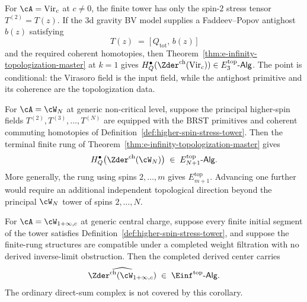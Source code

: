 \begin{corollary}[Virasoro ($N=2$) recovers the Volume~II
climax]
\label{cor:virasoro-N-2-climax}
\ClaimStatusConditional
{}%
For $\cA = \mathrm{Vir}_c$ at $c \ne 0$, the finite tower has
only the spin-$2$ stress tensor $T^{(2)}=T(z)$. If the
$3$d gravity BV model supplies a Faddeev--Popov antighost
$b(z)$ satisfying
\[
 T(z) \;=\; \bigl[\,Q_{\mathrm{tot}},\, b(z)\,\bigr]
\]
and the required coherent homotopies, then
Theorem~\textup{\ref{thm:e-infinity-topologization-master}}
at $k=1$ gives
$H^\bullet_Q(\Zder^{\mathrm{ch}}(\mathrm{Vir}_c))
\in E_3^{\mathrm{top}}\text{-}\mathsf{Alg}$. The point is
conditional: the Virasoro field is the input field, while the
antighost primitive and its coherence are the topologization
data.
\end{corollary}

\begin{corollary}
\label{cor:WN-E-Nplus1-top}
\ClaimStatusConditional
{}%
For $\cA = \cW_N$ at generic non-critical level, suppose the
principal higher-spin fields
$T^{(2)},T^{(3)},\ldots,T^{(N)}$ are equipped with the BRST
primitives and coherent commuting homotopies of
Definition~\ref{def:higher-spin-stress-tower}. Then the
terminal finite rung of
Theorem~\textup{\ref{thm:e-infinity-topologization-master}}
gives
\[
 H^\bullet_Q\bigl(\Zder^{\mathrm{ch}}(\cW_N)\bigr)
 \;\in\;
 E_{N+1}^{\mathrm{top}}\text{-}\mathsf{Alg}.
\]
More generally, the rung using spins $2,\ldots,m$ gives
$E_{m+1}^{\mathrm{top}}$. Advancing one further would require
an additional independent topological direction beyond the
principal $\cW_N$ tower of spins $2,\ldots,N$.
\end{corollary}

\begin{corollary}
\label{cor:Winfty-Einf-top}
\ClaimStatusConditional
{}%
For $\cA = \cW_{1+\infty,c}$ at generic central charge,
suppose every finite initial segment of the tower satisfies
Definition~\ref{def:higher-spin-stress-tower}, and suppose
the finite-rung structures are compatible under a completed
weight filtration with no derived inverse-limit obstruction.
Then the completed derived center carries
\[
 \widehat{\Zder^{\mathrm{ch}}(\cW_{1+\infty,c})}
 \;\in\;
 \Einf^{\mathrm{top}}\text{-}\mathsf{Alg}.
\]
The ordinary direct-sum complex is not covered by this
corollary.
\end{corollary}

